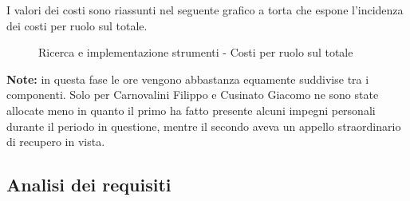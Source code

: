 		\noindent
		I valori dei costi sono riassunti nel seguente grafico a torta che espone l’incidenza dei costi per ruolo sul totale.
		\begin{center}
			\begin{figure}[htbp]
			\vspace{0.8cm}
			\caption{Ricerca e implementazione strumenti - Costi per ruolo sul totale}
			\end{figure}
		\end{center}			
		
	
	\noindent
	\textbf{Note:} in questa fase le ore vengono abbastanza equamente suddivise tra i componenti. Solo per Carnovalini Filippo e Cusinato Giacomo ne sono state allocate meno in quanto il primo ha fatto presente alcuni impegni personali durante il periodo in questione, mentre il secondo aveva un appello straordinario di recupero in vista.	
	
	\newpage
	\subsection{Analisi dei requisiti} %
	\label{sub:analisi_dei_requisiti}
